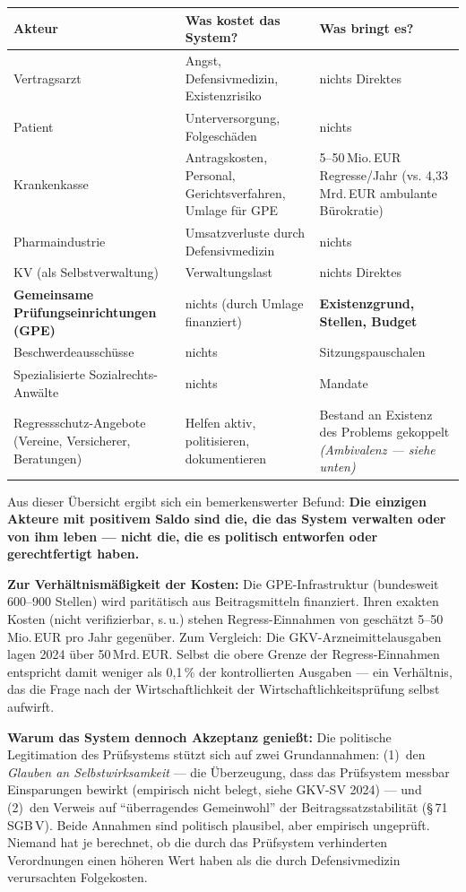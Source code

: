 \documentclass{umbruch-position}
\begin{document}
{\small
\begin{tabularx}{\textwidth}{X X X}
\toprule
\textbf{Akteur} & \textbf{Was kostet das System?} & \textbf{Was bringt es?} \\
\midrule
Vertragsarzt & Angst, Defensivmedizin, Existenzrisiko & nichts Direktes \\
Patient & Unterversorgung, Folgeschäden & nichts \\
Krankenkasse & Antragskosten, Personal, Gerichtsverfahren, Umlage für GPE & 5--50\,Mio.\,EUR Regresse/Jahr (vs. 4,33\,Mrd.\,EUR ambulante Bürokratie) \\
Pharmaindustrie & Umsatzverluste durch Defensivmedizin & nichts \\
KV (als Selbstverwaltung) & Verwaltungslast & nichts Direktes \\
\textbf{Gemeinsame Prüfungseinrichtungen (GPE)} & nichts (durch Umlage finanziert) & \textbf{Existenzgrund, Stellen, Budget} \\
Beschwerdeausschüsse & nichts & Sitzungspauschalen \\
Spezialisierte Sozialrechts-Anwälte & nichts & Mandate \\
Regressschutz-Angebote (Vereine, Versicherer, Beratungen) & Helfen aktiv, politisieren, dokumentieren & Bestand an Existenz des Problems gekoppelt \textit{(Ambivalenz — siehe unten)} \\
\bottomrule
\end{tabularx}
}

Aus dieser Übersicht ergibt sich ein bemerkenswerter Befund: \textbf{Die einzigen Akteure mit positivem Saldo sind die, die das System verwalten oder von ihm leben — nicht die, die es politisch entworfen oder gerechtfertigt haben.}

\textbf{Zur Verhältnismäßigkeit der Kosten:} Die GPE-Infrastruktur (bundesweit 600--900 Stellen) wird paritätisch aus Beitragsmitteln finanziert. Ihren exakten Kosten (nicht verifizierbar, s.\,u.) stehen Regress-Einnahmen von geschätzt 5--50\,Mio.\,EUR pro Jahr gegenüber. Zum Vergleich: Die GKV-Arzneimittelausgaben lagen 2024 über 50\,Mrd.\,EUR. Selbst die obere Grenze der Regress-Einnahmen entspricht damit weniger als 0,1\,\% der kontrollierten Ausgaben --- ein Verhältnis, das die Frage nach der Wirtschaftlichkeit der Wirtschaftlichkeitsprüfung selbst aufwirft.

\textbf{Warum das System dennoch Akzeptanz genießt:} Die politische Legitimation des Prüfsystems stützt sich auf zwei Grundannahmen: (1)~den \textit{Glauben an Selbstwirksamkeit} --- die Überzeugung, dass das Prüfsystem messbar Einsparungen bewirkt (empirisch nicht belegt, siehe GKV-SV 2024) --- und (2)~den Verweis auf ``überragendes Gemeinwohl'' der Beitragssatzstabilität (\S\,71 SGB\,V). Beide Annahmen sind politisch plausibel, aber empirisch ungeprüft. Niemand hat je berechnet, ob die durch das Prüfsystem verhinderten Verordnungen einen höheren Wert haben als die durch Defensivmedizin verursachten Folgekosten.
\end{document}
